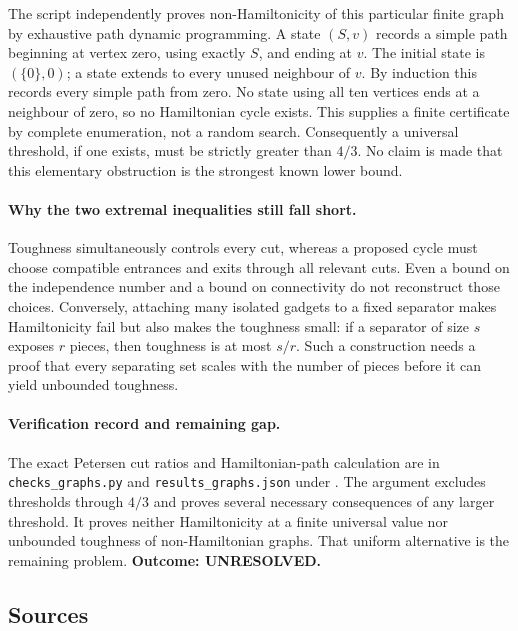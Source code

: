\documentclass[11pt,a4paper]{article}
\begin{document}
The script independently proves non-Hamiltonicity of this particular
finite graph by exhaustive path dynamic programming. A state $(S,v)$
records a simple path beginning at vertex zero, using exactly $S$,
and ending at $v$. The initial state is $(\{0\},0)$; a state extends
to every unused neighbour of $v$. By induction this records every
simple path from zero. No state using all ten vertices ends at a
neighbour of zero, so no Hamiltonian cycle exists. This supplies a
finite certificate by complete enumeration, not a random search.
Consequently a universal threshold, if one exists, must be strictly
greater than $4/3$. No claim is made that this elementary obstruction
is the strongest known lower bound.

\paragraph{Why the two extremal inequalities still fall short.}
Toughness simultaneously controls every cut, whereas a proposed cycle
must choose compatible entrances and exits through all relevant cuts.
Even a bound on the independence number and a bound on connectivity
do not reconstruct those choices. Conversely, attaching many isolated
gadgets to a fixed separator makes Hamiltonicity fail but also makes
the toughness small: if a separator of size $s$ exposes $r$ pieces,
then toughness is at most $s/r$. Such a construction needs a proof
that every separating set scales with the number of pieces before it
can yield unbounded toughness.

\paragraph{Verification record and remaining gap.}
The exact Petersen cut ratios and Hamiltonian-path calculation are in
\texttt{checks\_graphs.py} and \texttt{results\_graphs.json} under
.
The argument excludes thresholds through $4/3$ and proves several
necessary consequences of any larger threshold. It proves neither
Hamiltonicity at a finite universal value nor unbounded toughness of
non-Hamiltonian graphs. That uniform alternative is the remaining
problem. \textbf{Outcome: UNRESOLVED.}

\subsection{Sources}
\end{document}
